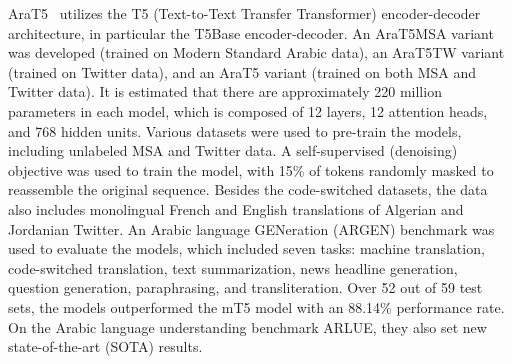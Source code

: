 AraT5~\cite{nagoudi2021arat5} utilizes the T5 (Text-to-Text Transfer Transformer) encoder-decoder architecture, in particular the T5Base encoder-decoder. An AraT5MSA variant was developed (trained on Modern Standard Arabic data), an AraT5TW variant (trained on Twitter data), and an AraT5 variant (trained on both MSA and Twitter data). It is estimated that there are approximately 220 million parameters in each model, which is composed of 12 layers, 12 attention heads, and 768 hidden units. Various datasets were used to pre-train the models, including unlabeled MSA and Twitter data. A self-supervised (denoising) objective was used to train the model, with 15\% of tokens randomly masked to reassemble the original sequence. Besides the code-switched datasets, the data also includes monolingual French and English translations of Algerian and Jordanian Twitter. An Arabic language GENeration (ARGEN) benchmark was used to evaluate the models, which included seven tasks: machine translation, code-switched translation, text summarization, news headline generation, question generation, paraphrasing, and transliteration. Over 52 out of 59 test sets, the models outperformed the mT5 model with an 88.14\% performance rate. On the Arabic language understanding benchmark ARLUE, they also set new state-of-the-art (SOTA) results.